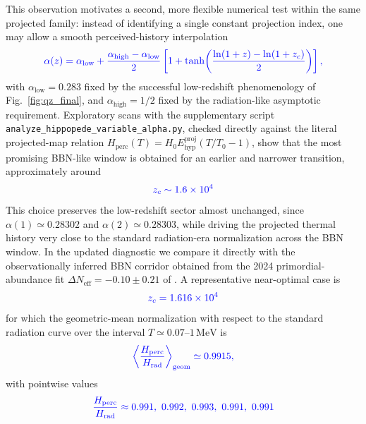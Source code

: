 \documentclass[11pt]{article}
\newcommand{\blue}[1]{{\color{blue}#1}}
\begin{document}
\blue{This observation motivates a second, more flexible numerical test within the same projected family: instead of identifying a single constant projection index, one may allow a smooth perceived-history interpolation}
\begin{equation}
\blue{
\alpha(z)=\alpha_{\mathrm{low}}+\frac{\alpha_{\mathrm{high}}-\alpha_{\mathrm{low}}}{2}
\left[
1+\tanh\!\left(
\frac{\ln(1+z)-\ln(1+z_c)}{2}
\right)
\right],
}
\end{equation}
\blue{with $\alpha_{\mathrm{low}}=0.283$ fixed by the successful low-redshift phenomenology of Fig.~\ref{fig:qz_final}, and $\alpha_{\mathrm{high}}=1/2$ fixed by the radiation-like asymptotic requirement. Exploratory scans with the supplementary script \texttt{analyze\_hippopede\_variable\_alpha.py}, checked directly against the literal projected-map relation $H_{\mathrm{perc}}(T)=H_0E_{\mathrm{hyp}}^{\mathrm{proj}}(T/T_0-1)$, show that the most promising BBN-like window is obtained for an earlier and narrower transition, approximately around}
\begin{equation}
\blue{
z_c\sim 1.6\times10^4
}
\end{equation}
\blue{This choice preserves the low-redshift sector almost unchanged, since $\alpha(1)\simeq0.28302$ and $\alpha(2)\simeq0.28303$, while driving the projected thermal history very close to the standard radiation-era normalization across the BBN window. In the updated diagnostic we compare it directly with the observationally inferred BBN corridor obtained from the 2024 primordial-abundance fit $\Delta N_{\mathrm{eff}}=-0.10\pm0.21$ of \cite{schoneberg2024bbn}. A representative near-optimal case is}
\begin{equation}
\blue{
z_c=1.616\times10^4
}
\end{equation}
\blue{for which the geometric-mean normalization with respect to the standard radiation curve over the interval $T\simeq0.07$--$1\,\mathrm{MeV}$ is}
\begin{equation}
\blue{
\left\langle \frac{H_{\mathrm{perc}}}{H_{\mathrm{rad}}}\right\rangle_{\mathrm{geom}}
\simeq 0.9915,
}
\end{equation}
\blue{with pointwise values}
\begin{equation}
\blue{
\frac{H_{\mathrm{perc}}}{H_{\mathrm{rad}}}\approx
0.991,\ 0.992,\ 0.993,\ 0.991,\ 0.991
}
\end{equation}
\end{document}
